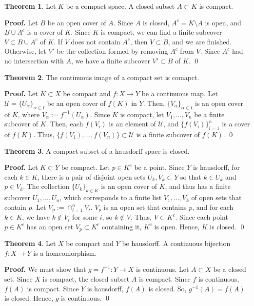 \documentclass{article}
\theoremstyle{definition}
\newtheorem{theorem}{Theorem}[subsection]
\begin{document}
\begin{theorem}
    Let $K$ be a compact space. A closed subset $A\subset K$ is compact.
\end{theorem}
    \noindent
    \textbf{Proof.} Let $B$ be an open cover of $A$. Since $A$ is closed, $A^c=K\setminus A$ is open, and $B\cup A^c$ is a cover of $K$. Since $K$ is compact, we can find a finite subcover $V\subset B\cup A^c$ of $K$. If $V$ does not contain $A^c$, then $V\subset B$, and we are finished. Otherwise, let $V'$ be the collection formed by removing $A^c$ from $V$. Since $A^c$ had no intersection with $A$, we have a finite subcover $V'\subset B$ of $K$. \qed 

\begin{theorem}
    The continuous image of a compact set is comapct.
\end{theorem}
    \noindent
    \textbf{Proof.} Let $K\subset X$ be compact and $f:X\rightarrow Y$ be a continuous map. Let $\mathcal{U}=\{U_\alpha\}_{\alpha\in I}$ be an open cover of $f(K)$ in $Y$. Then, $\{V_\alpha\}_{\alpha\in I}$ is an open cover of $K$, where $V_\alpha:=f^{-1}(U_\alpha)$. Since $K$ is compact, let $V_1,...,V_n$ be a finite subcover of $K$. Then, each $f(V_i)$ is an element of $\mathcal{U}$, and $\{f(V_i)\}_{i=1}^{n}$ is a cover of $f(K)$. Thus, $\{f(V_1),...,f(V_n)\}\subset \mathcal{U}$ is a finite subcover of $f(K)$. \qed

\begin{theorem}
    A compact subset of a hausdorff space is closed.
\end{theorem}
    \noindent
    \textbf{Proof.} Let $K\subset Y$ be compact. Let $p\in K^c$ be a point. Since $Y$ is hausdorff, for each $k\in K$, there is a pair of disjoint open sets $U_k, V_k\subset Y$ so that $k\in U_k$ and $p\in V_k$. The collection $\{U_k\}_{k\in K}$ is an open cover of $K$, and thus has a finite subcover $U_1,...,U_n$, which corresponds to a finite list $V_1,...,V_k$ of open sets that contain $p$. Let $V_p:=\cap_{i=1}^n V_i$. $V_p$ is an open set that contains $p$, and for each $k\in K$, we have $k\notin V_i$ for some $i$, so $k\notin V$. Thus, $V\subset K^c$. Since each point $p\in K^c$  has an open set $V_p\subset K^c$ containing it, $K^c$ is open. Hence, $K$ is closed. \qed
    

\begin{theorem}
    Let $X$ be compact and $Y$ be hausdorff. A continuous bijection $f:X\rightarrow Y$ is a homeomorphism.
\end{theorem}
    \noindent
    \textbf{Proof.} We must show that $g=f^{-1}:Y\rightarrow X$ is continuous. Let $A\subset X$ be a closed set. Since $X$ is compact, the closed subset $A$ is compact. Since $f$ is continuous, $f(A)$ is compact. Since $Y$ is hausdorff, $f(A)$ is closed. So, $g^{-1}(A)=f(A)$ is closed. Hence, $g$ is continuous. \qed 
\end{document}
